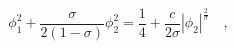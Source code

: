 \begin{equation}
\phi_1^2 +\frac{\sigma}{2(1-\sigma)}
\phi_2^2=\frac{1}{4}+\frac{c}{2 \sigma} |\phi_2|^\frac{2}{\sigma}
\quad , \label{eq:tra1}
\end{equation}

